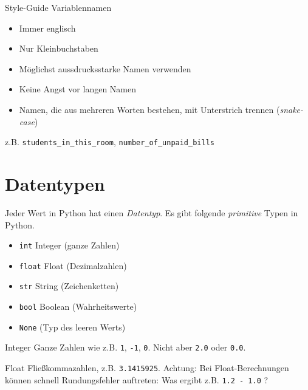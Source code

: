 \documentclass[algorithm,pgfplots,colortheme=dark]{cuzbeamer}
\begin{document}
\begin{frame}
\begin{exampleblock}{Style-Guide Variablennamen}
	\begin{itemize}
		\item Immer englisch
		\item Nur Kleinbuchstaben
		\item Möglichst aussdrucksstarke Namen verwenden
		\item Keine Angst vor langen Namen 
		\item Namen, die aus mehreren Worten bestehen, mit Unterstrich trennen (\textit{snake-case})
	\end{itemize}
	
	z.B. \texttt{students_in_this_room}, \texttt{number_of_unpaid_bills}
\end{exampleblock}

\end{frame}


\section{Datentypen}

\begin{frame}
\begin{block}{}
	Jeder Wert in Python hat einen \textit{Datentyp}. Es gibt folgende \textit{primitive} Typen in Python.
	\begin{itemize}
		\item \texttt{int}  Integer (ganze Zahlen)
		\item \texttt{float} Float (Dezimalzahlen)
		\item \texttt{str}  String (Zeichenketten)
		\item \texttt{bool} Boolean (Wahrheitswerte)
		\item \texttt{None} (Typ des leeren Werts)
	\end{itemize}
\end{block}
\end{frame}


\begin{frame}

\begin{block}{Integer}
Ganze Zahlen wie z.B. \texttt{1}, \texttt{-1}, \texttt{0}. Nicht aber 
\texttt{2.0} oder \texttt{0.0}. 	
\end{block}
\vspace{12pt}
\begin{block}{Float}
Fließkommazahlen, z.B. \texttt{3.1415925}. Achtung: Bei Float-Berechnungen können schnell Rundungsfehler auftreten: Was ergibt z.B. \texttt{1.2 - 1.0} ? 
\end{block}
\end{frame}
\end{document}
